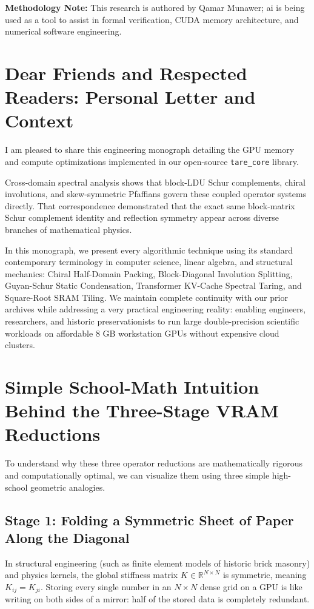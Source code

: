 \documentclass[11pt,a4paper]{article}
\begin{document}
\vspace{0.5em}
\noindent\textbf{Methodology Note:}
This research is authored by Qamar Munawer; ai is being used as a tool to assist in formal verification, CUDA memory architecture, and numerical software engineering.

\newpage

\section*{Dear Friends and Respected Readers: Personal Letter and Context}
I am pleased to share this engineering monograph detailing the GPU memory and compute optimizations implemented in our open-source \texttt{tare\_core} library. 

Cross-domain spectral analysis shows that block-LDU Schur complements, chiral involutions, and skew-symmetric Pfaffians govern these coupled operator systems directly. That correspondence demonstrated that the exact same block-matrix Schur complement identity and reflection symmetry appear across diverse branches of mathematical physics. 

In this monograph, we present every algorithmic technique using its standard contemporary terminology in computer science, linear algebra, and structural mechanics: Chiral Half-Domain Packing, Block-Diagonal Involution Splitting, Guyan-Schur Static Condensation, Transformer KV-Cache Spectral Taring, and Square-Root SRAM Tiling. We maintain complete continuity with our prior archives while addressing a very practical engineering reality: enabling engineers, researchers, and historic preservationists to run large double-precision scientific workloads on affordable 8 GB workstation GPUs without expensive cloud clusters.

\section{Simple School-Math Intuition Behind the Three-Stage VRAM Reductions}
To understand why these three operator reductions are mathematically rigorous and computationally optimal, we can visualize them using three simple high-school geometric analogies.

\subsection{Stage 1: Folding a Symmetric Sheet of Paper Along the Diagonal}
In structural engineering (such as finite element models of historic brick masonry) and physics kernels, the global stiffness matrix $K \in \mathbb{R}^{N \times N}$ is symmetric, meaning $K_{ij} = K_{ji}$. 
Storing every single number in an $N \times N$ dense grid on a GPU is like writing on both sides of a mirror: half of the stored data is completely redundant. 
\end{document}
